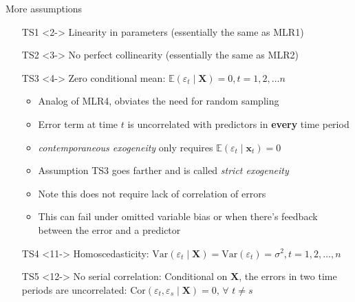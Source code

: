 \documentclass[
  ignorenonframetext,
]{beamer}
\begin{document}
\begin{frame}{More assumptions}
\label{more-assumptions}
\begin{itemize}
    \setlength{\itemsep}{3pt}\setlength{\parskip}{3pt}
    \item[TS1]<2-> Linearity in parameters (essentially the same as MLR1)
    \item[TS2]<3-> No perfect collinearity (essentially the same as MLR2)
    \item[TS3]<4-> Zero conditional mean: $\mathbb{E}\left(\varepsilon_t\mid\mathbf{X}\right) = 0, t = 1, 2, \dots n$
    \begin{itemize}
        \setlength{\itemsep}{3pt}\setlength{\parskip}{3pt}
        \item<5-> Analog of MLR4, obviates the need for random sampling
        \item<6-> Error term at time $t$ is uncorrelated with predictors in \textbf{every} time period
        \item<7-> \textit{contemporaneous exogeneity} only requires $\mathbb{E}\left(\varepsilon_t\mid\mathbf{x}_t\right) = 0$
        \item<8-> Assumption TS3 goes farther and is called \textit{strict exogeneity}
        \item<9-> Note this does not require lack of correlation of errors
        \item<10-> This can fail under omitted variable bias or when there's feedback between the error and a predictor
    \end{itemize}
    \item[TS4]<11-> Homoscedasticity: $\text{Var}\left(\varepsilon_t\mid\mathbf{X}\right) = \text{Var}\left(\varepsilon_t\right) = \sigma^2, t = 1, 2, \dots, n$
    \item[TS5]<12-> No serial correlation: Conditional on $\mathbf{X}$, the errors in two time periods are uncorrelated: $\text{Cor}\left(\varepsilon_t,\varepsilon_s\mid\mathbf{X}\right) = 0,\,\forall\,\, t \neq s$
\end{itemize}
\end{frame}
\end{document}
